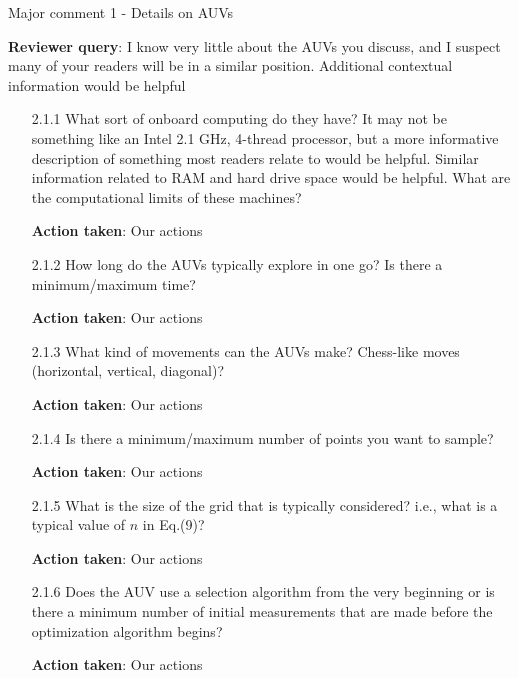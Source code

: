 \documentclass[a4paper]{article}
\def\reply{\textbf{Reviewer query}}
\def\action{\textbf{Action taken}}
\begin{document}
\begin{answers}
\item{Major comment 1 - Details on AUVs}\label{q12}

\reply: I know very little about the AUVs you discuss, and I suspect many of your readers will be in a similar position. Additional contextual information would be helpful

\begin{itemize}[noitemsep,topsep=0pt,parsep=0pt,partopsep=0pt]

\item[2.1.1] What sort of onboard computing do they have? It may not be something like an Intel 2.1 GHz, 4-thread processor, but a more informative description of something most readers relate to would be helpful. Similar information related to RAM and hard drive space would be helpful. What are the computational limits of these machines?\par
\action: Our actions
\vspace{1em}

\item[2.1.2] How long do the AUVs typically explore in one go? Is there a minimum/maximum time?\par 
\action: Our actions
\vspace{1em}

\item[2.1.3] What kind of movements can the AUVs make? Chess-like moves (horizontal, vertical, diagonal)?\par  
\action: Our actions
\vspace{1em}

\item[2.1.4] Is there a minimum/maximum number of points you want to sample?\par
\action: Our actions
\vspace{1em}

\item[2.1.5] What is the size of the grid that is typically considered? i.e., what is a typical value of $n$ in Eq.(9)?\par 
\action: Our actions
\vspace{1em}

\item[2.1.6] Does the AUV use a selection algorithm from the very beginning or is there a minimum number of initial measurements that are made before the optimization algorithm begins?\par
\action: Our actions
\vspace{1em}


\end{itemize}
\end{answers}
\end{document}
